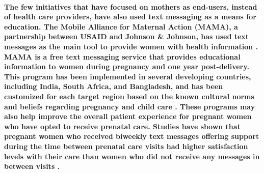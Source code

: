 \paragraph{The few initiatives that have focused on mothers as end-users, instead of health care providers, have also used text messaging as a means for education. The Mobile Alliance for Maternal Action (MAMA), a partnership between USAID and Johnson \& Johnson, has used text messages as the main tool to provide women with health information \citep{McCartney2012}. MAMA is a free text messaging service that provides educational information to women during pregnancy and one year post-delivery. This program has been implemented in several developing countries, including India, South Africa, and Bangladesh, and has been customized for each target region based on the known cultural norms and beliefs regarding pregnancy and child care \citep{McCartney2012}. These programs may also help improve the overall patient experience for pregnant women who have opted to receive prenatal care. Studies have shown that pregnant women who received biweekly text messages offering support during the time between prenatal care visits had higher satisfaction levels with their care than women who did not receive any messages in between visits \citep{Jareethum2008}.} 

